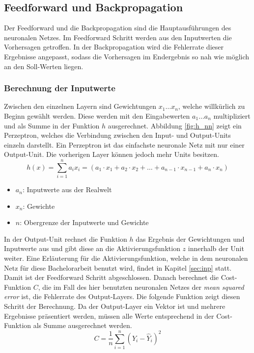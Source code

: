 \subsection{Feedforward und Backpropagation}
\label{sub:fee_back}
Der Feedforward und die Backpropagation sind die Hauptausführungen des neuronalen Netzes. Im Feedforward Schritt werden aus den Inputwerten die Vorhersagen getroffen. In der Backpropagation wird die Fehlerrate dieser Ergebnisse angepasst, sodass die Vorhersagen im Endergebnis so nah wie möglich an den Soll-Werten liegen.

\subsubsection{Berechnung der Inputwerte}
Zwischen den einzelnen Layern sind Gewichtungen  \(x_1 \dots x_n\), welche willkürlich zu Beginn gewählt werden. Diese werden mit den Eingabewerten  \(a_1 \dots a_n\) multipliziert und als Summe in der Funktion \(h\) ausgerechnet. Abbildung \ref{fig:h_nn} zeigt ein Perzeptron, welches die Verbindung zwischen den Input- und Output-Units einzeln darstellt. Ein Perzeptron ist das einfachste neuronale Netz mit nur einer Output-Unit. Die vorherigen Layer können jedoch mehr Units besitzen.
\newline
\[\displaystyle h(x)=\sum_{i=1}^{n} a_i x_i = (a_1 \cdot x_1 + a_2 \cdot x_2 + \dots + a_{n-1} \cdot x_{n-1} + a_n \cdot x_n)\]

\begin{itemize}
    \RaggedRight\item[] \(a_n\):  Inputwerte aus der Realwelt
    \RaggedRight\item[] \(x_n\):  Gewichte
    \RaggedRight\item[] \(n\):    Obergrenze der Inputwerte und Gewichte
\end{itemize}

In der Output-Unit rechnet die Funktion \(h\) das Ergebnis der Gewichtungen und Inputwerte aus und gibt diese an die Aktivierungsfunktion \(z\) innerhalb der Unit weiter. Eine Erläuterung für die Aktivierungsfunktion, welche in dem neuronalen Netz für diese Bachelorarbeit benutzt wird, findet in Kapitel \ref{sec:inp} statt. Damit ist der Feedforward Schritt abgeschlossen. Danach berechnet die Cost-Funktion \(C\), die im Fall des hier benutzten neuronalen Netzes der \emph{mean squared error} ist, die Fehlerrate des Output-Layers. Die folgende Funktion zeigt diesen Schritt der Berechnung. Da der Output-Layer ein Vektor ist und mehrere Ergebnisse präsentiert werden, müssen alle Werte entsprechend in der Cost-Funktion als Summe ausgerechnet werden.  
\newline
\[\displaystyle C=\dfrac{1}{n}\sum_{i=1}^{n}(Y_i - \hat{Y}_i)^2\]

